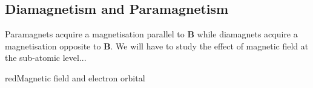 \subsection{Diamagnetism and Paramagnetism}
Paramagnets acquire a magnetisation parallel to $\mathbf{B}$ while diamagnets acquire a magnetisation opposite to $\mathbf{B}$. We will have to study the effect of magnetic field at the sub-atomic level...

\begin{mybox}{red}{Magnetic field and electron orbital}
    \begin{center}

        \begin{tikzpicture}[x=0.75pt,y=0.75pt,yscale=-1,xscale=1]


\end{tikzpicture}
\end{center}
\end{mybox}
